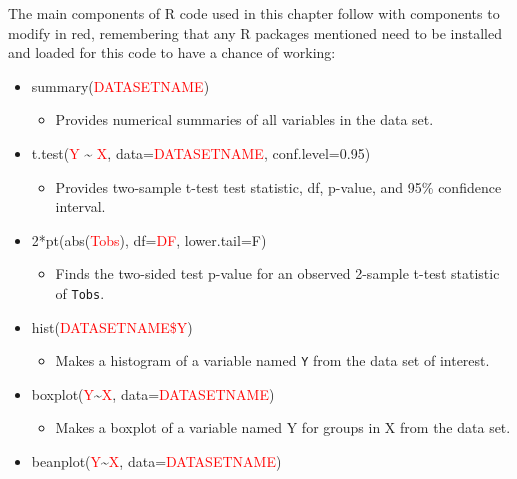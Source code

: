 \documentclass[]{book}
\providecommand{\tightlist}{%
  \setlength{\itemsep}{0pt}\setlength{\parskip}{0pt}}
\theoremstyle{definition}
\theoremstyle{definition}
\theoremstyle{remark}
\begin{document}
The main components of R code used in this chapter follow with
components to modify in red, remembering that any R packages mentioned
need to be installed and loaded for this code to have a chance of
working:

\begin{itemize}
\item
  summary(\textcolor{red}{DATASETNAME})

  \begin{itemize}
  \tightlist
  \item
    Provides numerical summaries of all variables in the data set.
  \end{itemize}
\item
  t.test(\textcolor{red}{Y} \textasciitilde{} \textcolor{red}{X},
  data=\textcolor{red}{DATASETNAME}, conf.level=0.95)

  \begin{itemize}
  \tightlist
  \item
    Provides two-sample t-test test statistic, df, p-value, and 95\%
    confidence interval.
  \end{itemize}
\item
  2*pt(abs(\textcolor{red}{Tobs}), df=\textcolor{red}{DF}, lower.tail=F)

  \begin{itemize}
  \tightlist
  \item
    Finds the two-sided test p-value for an observed 2-sample t-test
    statistic of \texttt{Tobs}.
  \end{itemize}
\item
  hist(\textcolor{red}{DATASETNAME\$Y})

  \begin{itemize}
  \tightlist
  \item
    Makes a histogram of a variable named \texttt{Y} from the data set
    of interest.
  \end{itemize}
\item
  boxplot(\textcolor{red}{Y}\textasciitilde{}\textcolor{red}{X},
  data=\textcolor{red}{DATASETNAME})

  \begin{itemize}
  \tightlist
  \item
    Makes a boxplot of a variable named Y for groups in X from the data
    set.
  \end{itemize}
\item
  beanplot(\textcolor{red}{Y}\textasciitilde{}\textcolor{red}{X},
  data=\textcolor{red}{DATASETNAME})


\end{itemize}
\end{document}
